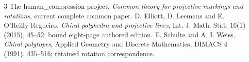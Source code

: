 \documentclass[11pt,a4paper]{article}
\begin{document}
\begin{thebibliography}{3}
 The human\_compression project,
\emph{Common theory for projective markings and rotations}, current complete common paper.
 D. Elliott, D. Leemans and E. O'Reilly-Regueiro,
\emph{Chiral polyhedra and projective lines}, Int. J. Math. Stat.
16(1) (2015), 45--52; bound eight-page authored edition.
 E. Schulte and A. I. Weiss, \emph{Chiral polytopes},
Applied Geometry and Discrete Mathematics, DIMACS 4 (1991), 435--516;
retained rotation correspondence.
\end{thebibliography}
\end{document}
